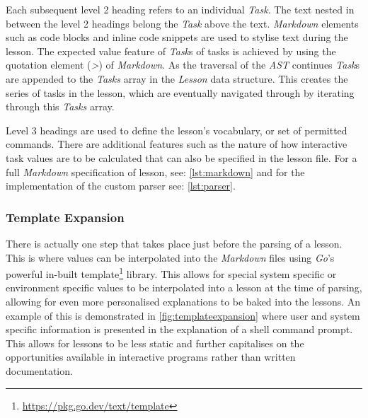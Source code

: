 Each subsequent level 2 heading refers to an individual \textit{Task}. The text
nested in between the level 2 headings belong the \textit{Task} above the text.
\textit{Markdown} elements such as code blocks and inline code snippets are
used to stylise text during the lesson. The expected value feature of
\textit{Task}s of tasks is achieved by using the quotation element (\textit{>})
of \textit{Markdown}. As the traversal of the \textit{AST} continues
\textit{Task}s are appended to the \textit{Tasks} array in the \textit{Lesson}
data structure. This creates the series of tasks in the lesson, which are
eventually navigated through by iterating through this \textit{Tasks} array. 

Level 3 headings are used to define the lesson's vocabulary, or set of
permitted commands. There are additional features such as the nature of how
interactive task values are to be calculated that can also be specified in the
lesson file. For a full \textit{Markdown} specification of lesson, see:
\autoref{lst:markdown} and for the implementation of the custom parser see: \autoref{lst:parser}. 

\subsubsection{Template Expansion}

There is actually one step that takes place just before the parsing of a
lesson. This is where values can be interpolated into the \textit{Markdown}
files using \textit{Go}'s powerful in-built
template\footnote{\url{https://pkg.go.dev/text/template}} library. This allows
for special system specific or environment specific values to be interpolated
into a lesson at the time of parsing, allowing for even more personalised
explanations to be baked into the lessons. An example of this is demonstrated
in \autoref{fig:templateexpansion} where user and system specific information
is presented in the explanation of a shell command prompt. This allows for
lessons to be less static and further capitalises on the opportunities
available in interactive programs rather than written documentation.

